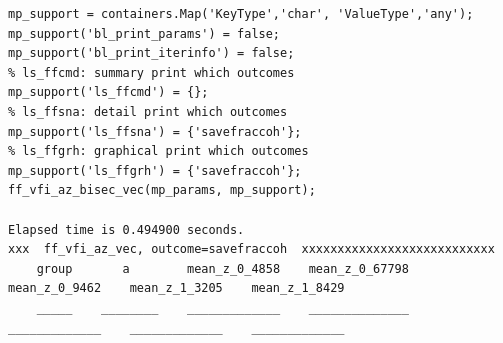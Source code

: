 \documentclass[
]{book}
\begin{document}
\begin{verbatim}
mp_support = containers.Map('KeyType','char', 'ValueType','any');
mp_support('bl_print_params') = false;
mp_support('bl_print_iterinfo') = false;
% ls_ffcmd: summary print which outcomes
mp_support('ls_ffcmd') = {};
% ls_ffsna: detail print which outcomes
mp_support('ls_ffsna') = {'savefraccoh'};
% ls_ffgrh: graphical print which outcomes
mp_support('ls_ffgrh') = {'savefraccoh'};
ff_vfi_az_bisec_vec(mp_params, mp_support);

Elapsed time is 0.494900 seconds.
xxx  ff_vfi_az_vec, outcome=savefraccoh  xxxxxxxxxxxxxxxxxxxxxxxxxxx
    group       a        mean_z_0_4858    mean_z_0_67798    mean_z_0_9462    mean_z_1_3205    mean_z_1_8429
    _____    ________    _____________    ______________    _____________    _____________    _____________


\end{verbatim}
\end{document}
